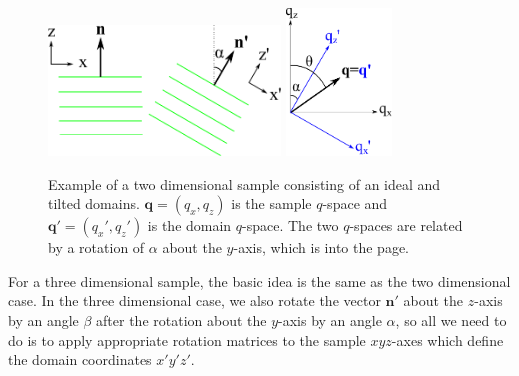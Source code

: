 \begin{figure}
  \centering
  \includegraphics[width=0.55\textwidth]{figures/ripple/mosaic/mosaic_2D}
  \quad\quad
  \includegraphics[width=0.25\textwidth]{figures/ripple/mosaic/mosaic_2Dqspace}
  \caption[Example of a two dimensional sample consisting of an ideal
  and tilted domains]
  {Example of a two dimensional sample consisting of an ideal
  and tilted domains. $\mathbf{q} = (q_x,q_z)$ is the sample $q$-space and
  $\mathbf{q'} = (q_x',q_z')$ is the domain $q$-space. The two $q$-spaces
  are related by a rotation of $\alpha$ about the $y$-axis, which is into 
  the page.}
  \label{fig:mosaic_2D}
\end{figure}

For a three dimensional sample, the basic idea is the same as the two 
dimensional case. In the three dimensional case, we also rotate the vector $\mathbf{n'}$
about the $z$-axis by an angle $\beta$ after the rotation about the $y$-axis
by an angle $\alpha$, so
all we need to do is to apply appropriate rotation matrices to
the sample $xyz$-axes which define the domain coordinates $x'y'z'$.

